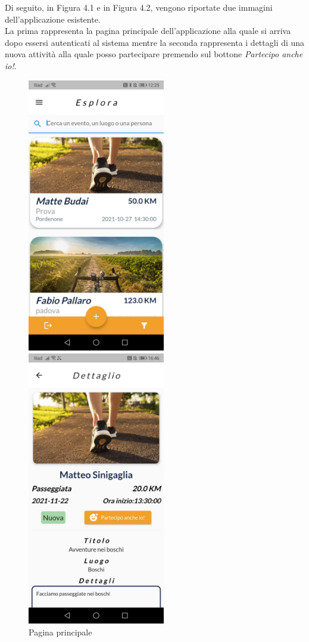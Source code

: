  \newpage
 
 Di seguito, in Figura 4.1 e in Figura 4.2, vengono riportate due immagini dell'applicazione esistente.\\
 La prima rappresenta la pagina principale dell'applicazione alla quale si arriva dopo essersi autenticati al sistema mentre la seconda rappresenta i dettagli di una nuova attività alla quale posso partecipare premendo sul bottone \textit{Partecipo anche io!}.\\
 
\begin{figure}[htbp]
	\begin{minipage}[b]{0.47\textwidth}
		\centering
		\includegraphics[width=6cm]{immagini/colori.jpeg}
		\caption{Pagina principale}
		\label{fig:Pagina principale}
	\end{minipage}
	\hfill
	\begin{minipage}[b]{0.47\textwidth}
		\centering
		\includegraphics[width=6cm]{immagini/partecipo.jpeg}

\end{minipage}
\end{figure}
